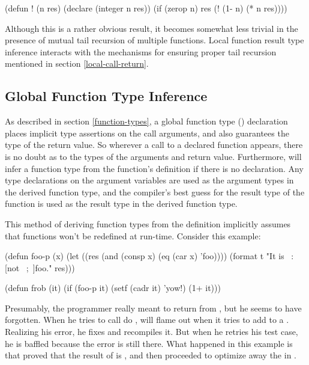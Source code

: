 \begin{lisp}
(defun ! (n res)
  (declare (integer n res))
  (if (zerop n)
      res
      (! (1- n) (* n res))))
\end{lisp}

Although this is a rather obvious result, it becomes somewhat less
trivial in the presence of mutual tail recursion of multiple
functions.  Local function result type inference interacts with the
mechanisms for ensuring proper tail recursion mentioned in section
\ref{local-call-return}.


\subsection{Global Function Type Inference}
\label{function-type-inference}

As described in section \ref{function-types}, a global function type
() declaration places implicit type assertions on the
call arguments, and also guarantees the type of the return value.  So
wherever a call to a declared function appears, there is no doubt as
to the types of the arguments and return value.  Furthermore,
\python{} will infer a function type from the function's definition if
there is no  declaration.  Any type declarations on the
argument variables are used as the argument types in the derived
function type, and the compiler's best guess for the result type of
the function is used as the result type in the derived function type.

This method of deriving function types from the definition implicitly assumes
that functions won't be redefined at run-time.  Consider this example:
\begin{lisp}
(defun foo-p (x)
  (let ((res (and (consp x) (eq (car x) 'foo))))
    (format t "It is ~:[not ~;~]foo." res)))

(defun frob (it)
  (if (foo-p it)
      (setf (cadr it) 'yow!)
      (1+ it)))
\end{lisp}

Presumably, the programmer really meant to return  from
, but he seems to have forgotten.  When he tries to call
do ,  will flame out when
it tries to add to a .  Realizing his error, he fixes
 and recompiles it.  But when he retries his test case, he
is baffled because the error is still there.  What happened in this
example is that \python{} proved that the result of  is
, and then proceeded to optimize away the  in
.

